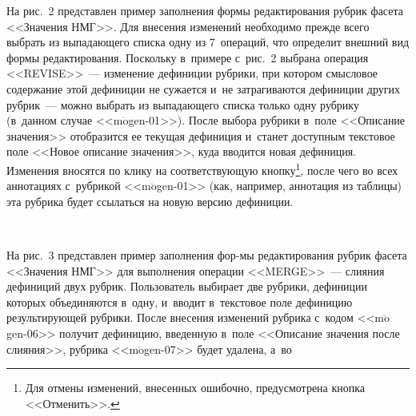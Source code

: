 \begin{multicols}{2}
\begin{figure*}
\begin{center}
\end{center}
\vspace*{-9pt}
  \end{figure*}
  
  На рис.~2 представлен пример заполнения формы редактирования руб\-рик 
фасета <<Значения НМГ>>. Для внесения изменений необходимо преж\-де 
всего выбрать из вы\-па\-да\-юще\-го списка одну из 7~операций, что определит 
внешний вид формы редактирования. Поскольку в~примере с~рис.~2 
выбрана операция <<REVISE>>~--- изменение дефиниции рубрики, при 
котором смыс\-ло\-вое содержание этой дефиниции не сужается и~не 
затрагиваются дефиниции других руб\-рик~--- можно выбрать из 
выпадающего списка только одну руб\-ри\-ку (в~данном случае  
<<m$\ddot{\mbox{o}}$gen-01>>). После выбора руб\-ри\-ки в~поле 
<<Описание значения>> отобразится ее текущая дефиниция и~станет 
до\-ступ\-ным текс\-то\-вое поле <<Новое описание значения>>, куда вводится 
новая дефиниция. Изменения вносятся по клику на со\-от\-вет\-ст\-ву\-ющую 
кнопку\footnote{Для отмены изменений, внесенных ошибочно, предусмот\-ре\-на кнопка 
<<Отменить>>.}, после чего во всех аннотациях с~руб\-ри\-кой 
<<m$\ddot{\mbox{o}}$gen-01>> (как, например, аннотация из таблицы) эта 
руб\-ри\-ка будет ссылаться на новую версию дефиниции.

  \begin{figure*} %
  \vspace*{1pt}
  \begin{center}  
    \mbox{%
\epsfxsize=161.76mm
}

\end{center}
\vspace*{-9pt}
  \end{figure*}
  
  На рис.~3 представлен пример заполнения фор-\linebreak  мы редактирования руб\-рик 
фасета <<Значения НМГ>> для выполнения операции <<MERGE>>~--- 
слияния дефиниций двух руб\-рик. Пользователь выбирает две руб\-ри\-ки, 
дефиниции которых объединяются в~одну, и~вводит в~текс\-то\-вое поле 
дефиницию результирующей руб\-ри\-ки. После внесения изменений руб\-ри\-ка 
с~кодом <<m$\ddot{\mbox{o}}$gen-06>> получит дефиницию, введенную 
в~поле <<Описание значения после слияния>>, руб\-ри\-ка 
<<m$\ddot{\mbox{o}}$gen-07>> будет удалена, а~во\linebreak\vspace*{-12pt}

\pagebreak

\end{multicols}

